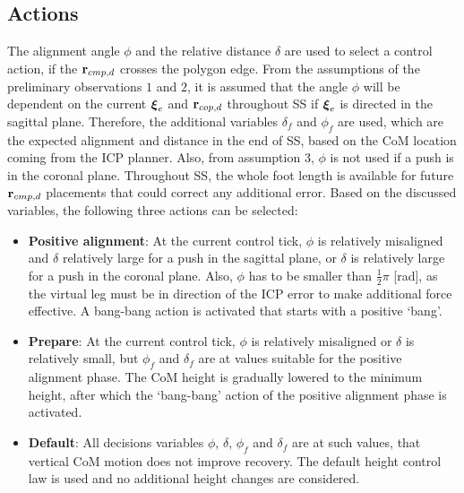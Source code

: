 \subsection{Actions}
The alignment angle $\phi$ and the relative distance $\delta$ are used to select a control action, if the $\mathbf{r}_{cmp,d}$ crosses the polygon edge. From the assumptions of the preliminary observations $1$ and $2$, it is assumed that the angle $\phi$ will be dependent on the current $\boldsymbol{\xi}_e$ and $\mathbf{r}_{cop,d}$ throughout \ac{SS} if $\boldsymbol{\xi}_e$ is directed in the sagittal plane. Therefore, the additional variables $\delta_f$ and $\phi_f$ are used, which are the expected alignment and distance in the end of \ac{SS}, based on the \ac{CoM} location coming from the \ac{ICP} planner. Also, from assumption $3$, $\phi$ is not used if a push is in the coronal plane. Throughout \ac{SS}, the whole foot length is available for future $\mathbf{r}_{cmp,d}$ placements that could correct any additional error. Based on the discussed variables, the following three actions can be selected:
\begin{itemize}
	\item \textbf{Positive alignment}: At the current control tick, $\phi$ is relatively misaligned and $\delta$ relatively large for a push in the sagittal plane, or $\delta$ is relatively large for a push in the coronal plane. Also, $\phi$ has to be smaller than $\frac{1}{2}\pi$ [rad], as the virtual leg must be in direction of the \ac{ICP} error to make additional force effective. A bang-bang action is activated that starts with a positive `bang'.
	\item \textbf{Prepare}: At the current control tick, $\phi$ is relatively misaligned or $\delta$ is relatively small, but $\phi_f$ and $\delta_f$ are at values suitable for the positive alignment phase. The \ac{CoM} height is gradually lowered to the minimum height, after which the `bang-bang' action of the positive alignment phase is activated.
	\item \textbf{Default}: All decisions variables $\phi$, $\delta$, $\phi_f$ and $\delta_f$ are at such values, that vertical \ac{CoM} motion does not improve recovery. The default height control law is used and no additional height changes are considered.
\end{itemize}

